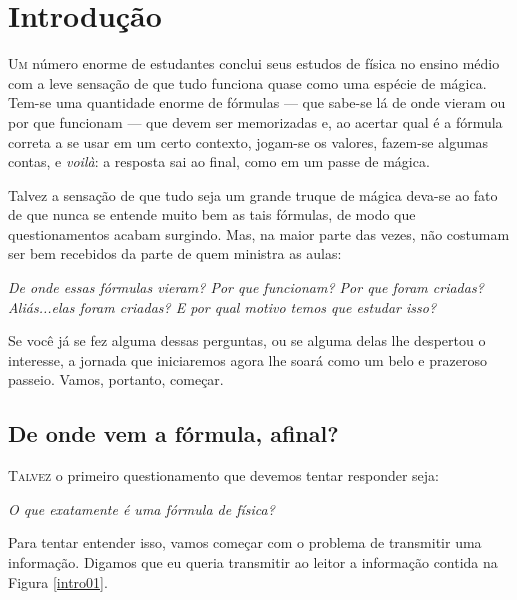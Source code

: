 
\chapter{Introdução} \label{chapter_intro}



\lettrine{U}{m} número enorme de estudantes conclui seus estudos de física no ensino médio com a leve sensação de que tudo funciona quase como uma espécie de mágica. Tem-se uma quantidade enorme de fórmulas --- que sabe-se lá de onde vieram ou por que funcionam --- que devem ser memorizadas e, ao acertar qual é a fórmula correta a se usar em um certo contexto, jogam-se os valores, fazem-se algumas contas, e \textit{voilà}: a resposta sai ao final, como em um passe de mágica.


Talvez a sensação de que tudo seja um grande truque de mágica deva-se ao fato de que nunca se entende muito bem as tais fórmulas, de modo que questionamentos acabam surgindo. Mas, na maior parte das vezes, não costumam ser bem recebidos da parte de quem ministra as aulas:

\begin{center}
  \textit{De onde essas fórmulas vieram? Por que funcionam? Por que foram criadas? Aliás...elas foram criadas? E por qual motivo temos que estudar isso?}
\end{center}

Se você já se fez alguma dessas perguntas, ou se alguma delas lhe despertou o interesse, a jornada que iniciaremos agora lhe soará como um belo e prazeroso passeio. Vamos, portanto, começar.


\section{De onde vem a fórmula, afinal?}

\lettrine{T}{alvez} o primeiro questionamento que devemos tentar responder seja:

\begin{center}
    \textit{O que exatamente é uma fórmula de física?}
\end{center}


Para tentar entender isso, vamos começar com o problema de transmitir uma informação. Digamos que eu queria transmitir ao leitor a informação contida na Figura \ref{intro01}.

